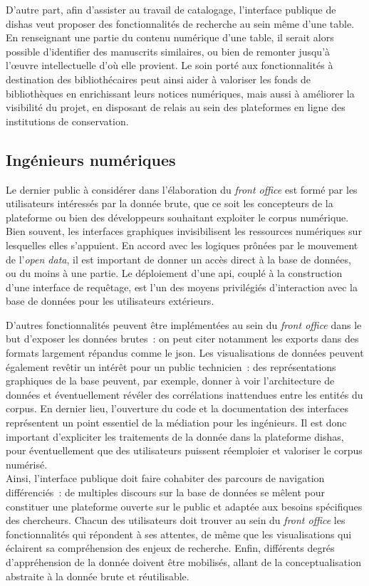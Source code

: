 \documentclass[a4paper,12pt,twoside]{book}
\newcommand{\eng}{\emph}
\newcommand{\bdd}{base de données\xspace}
\newcommand{\dishas}{\gls{dishas}\xspace}
\newcommand{\api}{\gls{api}\xspace}
\newcommand{\json}{\gls{json}\xspace}
\begin{document}
D'autre part, afin d'assister au travail de catalogage, l'interface publique de \dishas veut proposer des fonctionnalités de recherche au sein même d'une table. En renseignant une partie du contenu numérique d'une table, il serait alors possible d'identifier des manuscrits similaires, ou bien de remonter jusqu'à l'œuvre intellectuelle d'où elle provient. Le soin porté aux fonctionnalités à destination des bibliothécaires peut ainsi aider à valoriser les fonds de bibliothèques en enrichissant leurs notices numériques, mais aussi à améliorer la visibilité du projet, en disposant de relais au sein des plateformes en ligne des institutions de conservation.

		\subsection{Ingénieurs numériques}
Le dernier public à considérer dans l'élaboration du \eng{front office} est formé par les utilisateurs intéressés par la donnée brute, que ce soit les concepteurs de la plateforme ou bien des développeurs souhaitant exploiter le corpus numérique. Bien souvent, les interfaces graphiques invisibilisent les ressources numériques sur lesquelles elles s'appuient. En accord avec les logiques prônées par le mouvement de l'\eng{open data}, il est important de donner un accès direct à la base de données, ou du moins à une partie. Le déploiement d'une \api, couplé à la construction d'une interface de requêtage, est l'un des moyens privilégiés d'interaction avec la \bdd pour les utilisateurs extérieurs.

D'autres fonctionnalités peuvent être implémentées au sein du \eng{front office} dans le but d'exposer les données brutes~: on peut citer notamment les exports dans des formats largement répandus comme le \json. Les visualisations de données peuvent également revêtir un intérêt pour un public technicien~: des représentations graphiques de la base peuvent, par exemple, donner à voir l'architecture de données et éventuellement révéler des corrélations inattendues entre les entités du corpus. En dernier lieu, l'ouverture du code et la documentation des interfaces représentent un point essentiel de la médiation pour les ingénieurs. Il est donc important d'expliciter les traitements de la donnée dans la plateforme \dishas, pour éventuellement que des utilisateurs puissent réemploier et valoriser le corpus numérisé.\\

Ainsi, l'interface publique doit faire cohabiter des parcours de navigation différenciés~: de multiples discours sur la \bdd se mêlent pour constituer une plateforme ouverte sur le public et adaptée aux besoins spécifiques des chercheurs. Chacun des utilisateurs doit trouver au sein du \eng{front office} les fonctionnalités qui répondent à ses attentes, de même que les visualisations qui éclairent sa compréhension des enjeux de recherche. Enfin, différents degrés d'appréhension de la donnée doivent être mobilisés, allant de la conceptualisation abstraite à la donnée brute et réutilisable.
\end{document}
